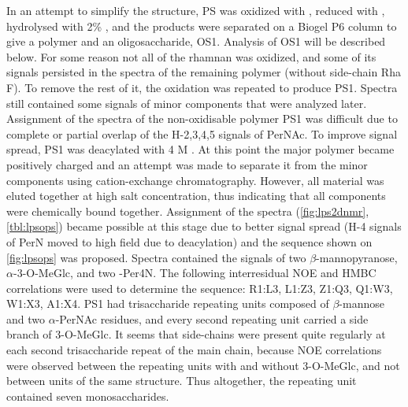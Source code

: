 In an attempt to simplify the structure, \ac{PS} was oxidized with , reduced with
, hydrolysed with 2\% , and the products were separated on a Biogel P6 column
to give a polymer and an oligosaccharide, \ac{OS}1. Analysis of \ac{OS}1 will be described below. For
some reason not all of the rhamnan was oxidized, and some of its signals persisted in the
spectra of the remaining polymer (without side-chain Rha F). To remove the rest of it, the
oxidation was repeated to produce \ac{PS}1. Spectra still contained some signals of minor
components that were analyzed later. Assignment of the spectra of the non-oxidisable polymer \ac{PS}1 was
difficult due to complete or partial overlap of the H-2,3,4,5 signals of PerNAc. To improve
signal spread, \ac{PS}1 was deacylated with 4 M . At this point the major polymer
became positively charged and an attempt was made to separate it from the minor components using
cation-exchange chromatography. However, all material was eluted together at high salt
concentration, thus indicating that all components were chemically bound together. Assignment of
the spectra (\cref{fig:lps2dnmr}, \cref{tbl:lpsops}) became possible at this stage due to better
signal spread (H-4 signals of PerN moved to high field due to deacylation) and the sequence
shown on \cref{fig:lpsops} was proposed. Spectra contained the signals of two
$\beta$-mannopyranose, $\alpha$-3-O-MeGlc, and two -Per4N. The following interresidual \ac{NOE}
and \ac{HMBC} correlations were used to determine the sequence: R1:L3, L1:Z3, Z1:Q3, Q1:W3,
W1:X3, A1:X4. \Ac{PS}1 had trisaccharide repeating units composed of $\beta$-mannose and two
$\alpha$-PerNAc residues, and every second repeating unit carried a side branch of 3-O-MeGlc. It
seems that side-chains were present quite regularly at each second trisaccharide repeat of the
main chain, because \ac{NOE} correlations were observed between the repeating units with and
without 3-O-MeGlc, and not between units of the same structure. Thus altogether, the repeating
unit contained seven monosaccharides.

